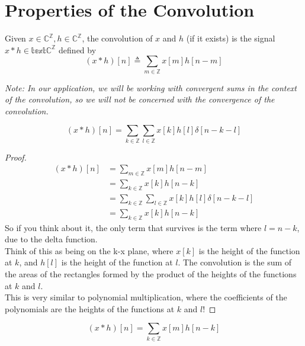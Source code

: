 \chapter{Properties of the Convolution}

\begin{theorem}
     \label{thm:convolution-is-linear}
    Given $x \in \mathbb{C}^{\mathbb{Z}}, h \in \mathbb{C}^{\mathbb{Z}}$, the convolution of $x$ and $h$ (if it exists) is the signal $x * h \in \mathbb{text{C}}^{\mathbb{Z}}$ defined by
    $$ (x * h)[n] \triangleq \sum_{m \in \mathbb{Z}} x[m]h[n-m] $$

    \textit{Note: In our application, we will be working with convergent sums in the context of the convolution, so we will not be concerned with the convergence of the convolution.}
\end{theorem}

\begin{theorem}
     \label{thm:alternate-convolution-formula}
    $$ (x*h)[n] = \sum_{k \in \mathbb{Z}}\sum_{l \in \mathbb{Z}} x[k]h[l] \delta[n-k-l] $$
\end{theorem}

\begin{proof}
    \begin{align*}
        (x*h)[n] & = \sum_{m \in \mathbb{Z}} x[m]h[n-m]                                    \\
                 & = \sum_{k \in \mathbb{Z}} x[k]h[n-k]                                    \\
                 & = \sum_{k \in \mathbb{Z}}\sum_{l \in \mathbb{Z}} x[k]h[l] \delta[n-k-l] \\
                 & = \sum_{k \in \mathbb{Z}} x[k]h[n - k]
    \end{align*}
    So if you think about it, the only term that survives is the term where $l = n - k$, due to the delta function. \\
    Think of this as being on the k-x plane, where $x[k]$ is the height of the function at $k$, and $h[l]$ is the height of the function at $l$. The convolution is the sum of the areas of the rectangles formed by the product of the heights of the functions at $k$ and $l$. \\
    This is very similar to polynomial multiplication, where the coefficients of the polynomials are the heights of the functions at $k$ and $l$!
\end{proof}

\begin{example}
    \begin{equation*}
        (x * h) [n] = \sum_{k \in \mathbb{Z}} x[m]h[n-k]
    \end{equation*}
\end{example}

